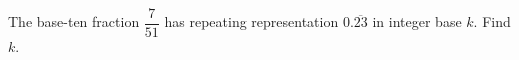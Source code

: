 The base-ten fraction $\dfrac{7}{51}$ has repeating representation $0.\overline{23}$ in integer base $k$. Find $k$.
